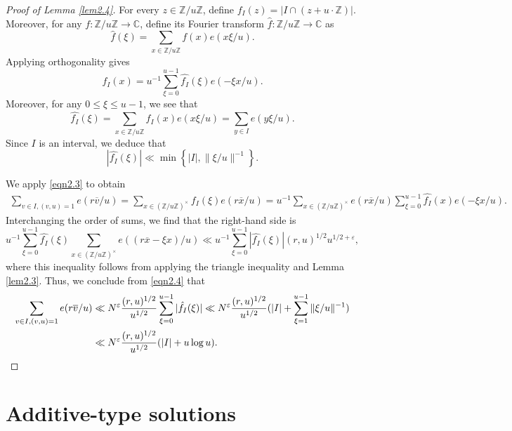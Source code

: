 \documentclass[12pt,reqno]{amsart}
\theoremstyle{definition}
\theoremstyle{remark}
\numberwithin{equation}{section}
\renewcommand{\leq}{\leqslant}
\def\eps{\varepsilon}
\def \Z {\mathbb{Z}}
\newcommand{\n}[1]{\|{#1}\|}
\newcommand\1{\mathds{1}}
\begin{document}
\begin{proof}[Proof of Lemma \ref{lem2.4}]
For every $z \in \Z/u\Z$, define $f_I(z) = |I \cap (z + u \cdot \Z)|$. Moreover, for any $f : \Z/u\Z \to \mathbb{C}$, define its Fourier transform $\hat{f}: \Z/u\Z \to \mathbb{C}$ as
\[ \hat{f}(\xi) = \sum_{x \in \Z/u\Z} f(x) e(x \xi/u).  \]
Applying orthogonality gives
\begin{equation} \label{eqn2.3}
f_I(x) = u^{-1}\sum_{\xi =0}^{u-1} \hat{f_I}(\xi) e(- \xi x/u).
\end{equation}
Moreover, for any $0 \leq \xi \leq u-1$, we see that
\[ \hat{f_I}(\xi) = \sum_{x \in \Z/u\Z} f_I(x) e(x \xi/u) = \sum_{y \in I} e(y \xi/u)  . \]
Since $I$ is an interval, we deduce that
\begin{equation} \label{eqn2.4}
|\hat{f_I}(\xi)| \ll \min \left\{  |I|, \n{\xi/u }^{-1} \right\}. 
\end{equation}

We apply \eqref{eqn2.3} to obtain
\begin{align*}
   \sum_{v \in I, (v,u) = 1} e(r \overline{v}/u) 
    = \sum_{x \in (\mathbb{Z}/u \mathbb{Z})^{\times}} f_I(\xi) e( r \overline{x}/u) = u^{-1}\sum_{x \in (\mathbb{Z}/u \mathbb{Z})^{\times}}  e(r \overline{x}/u) \sum_{\xi =0}^{u-1} \hat{f_I}(x) e(- \xi x/u) .
\end{align*}
Interchanging the order of sums, we find that the right-hand side is
\[  u^{-1} \sum_{\xi = 0}^{u-1} \hat{f_I}(\xi) \sum_{x \in (\mathbb{Z}/u \mathbb{Z})^{\times}} e( (r\overline{x} - \xi x)/u) \ll u^{-1} \sum_{\xi =0}^{u-1} |\hat{f_I}(\xi)| (r,u)^{1/2} u^{1/2 + \eps},   \]
where this inequality follows from applying the triangle inequality and Lemma \ref{lem2.3}. Thus, we conclude from \eqref{eqn2.4} that
\begin{align*}
    \sum_{v \in I, (v,u) = 1} e(r \overline{v}/u)  & \ll N^{\eps}\frac{(r,u)^{1/2}}{u^{1/2}} \sum_{\xi =0}^{u-1} |\hat{f_I}(\xi)| \ll N^{\eps} \frac{(r,u)^{1/2}}{u^{1/2}} ( |I| + \sum_{\xi =1}^{u-1} \n{ \xi/u}^{-1} ) \\
    & \ll N^{\eps} \frac{(r,u)^{1/2}}{u^{1/2}} ( |I| + u \log u ). \qedhere
\end{align*}
\end{proof}




\section{Additive-type solutions} \label{sec3}
\end{document}
